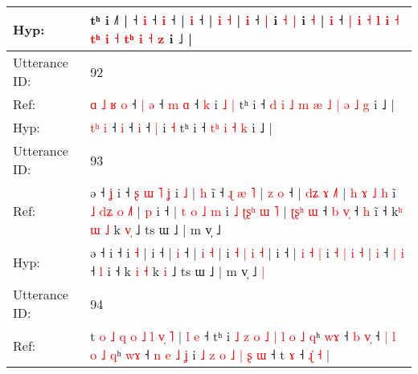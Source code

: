 \documentclass[10pt]{article}
\DeclareRobustCommand{\hl}[1]{{\textcolor{red}{#1}}}
\begin{document}
\begin{longtable}{ll}
 \\
Hyp: & tʰ i ˩˥ |\hl{}\hl{}\hl{}\hl{}\hl{}\hl{} ˧\hl{}\hl{} \hl{i} ˧\hl{}\hl{} \hl{i} ˧ |\hl{}\hl{} \hl{i} ˧\hl{}\hl{}\hl{}\hl{}\hl{}\hl{}\hl{}\hl{} | \hl{}\hl{i} \hl{}\hl{˧} |\hl{}\hl{}\hl{} \hl{i} ˧ \hl{|} i \hl{˧} \hl{|} i \hl{˧} |\hl{}\hl{} \hl{i} ˧\hl{}\hl{}\hl{}\hl{} \hl{|} \hl{}\hl{i} \hl{˧} \hl{l} \hl{i} \hl{}\hl{˧} \hl{}\hl{t}\hl{ʰ} \hl{i} \hl{˧} \hl{}\hl{t}\hl{ʰ} \hl{i} \hl{˧} \hl{z} i ˩\hl{} |
 \\
\midrule
Utterance ID: & 92 \\
Ref: & \hl{ɑ}\hl{ }\hl{˩}\hl{ }\hl{ʁ} \hl{o} ˧\hl{ }\hl{|} \hl{ə} ˧\hl{ }\hl{m} \hl{ɑ} ˧ \hl{k} i\hl{ }\hl{˩} \hl{|} tʰ i ˧\hl{ }\hl{d}\hl{ }\hl{i}\hl{ }\hl{˩}\hl{ }\hl{m}\hl{ }\hl{æ} \hl{˩}\hl{ }\hl{|} \hl{ə} \hl{˩} \hl{g} i ˩ |
 \\
Hyp: & \hl{}\hl{}\hl{}\hl{t}\hl{ʰ} \hl{i} ˧\hl{}\hl{} \hl{i} ˧\hl{}\hl{} \hl{i} ˧ \hl{|} i\hl{}\hl{} \hl{˧} tʰ i ˧\hl{}\hl{}\hl{}\hl{}\hl{}\hl{}\hl{}\hl{}\hl{}\hl{} \hl{}\hl{t}\hl{ʰ} \hl{i} \hl{˧} \hl{k} i ˩ |
 \\
\midrule
Utterance ID: & 93 \\
Ref: & ə ˧\hl{ }\hl{ʝ} i ˧\hl{ }\hl{ʂ}\hl{ }\hl{ɯ}\hl{ }\hl{˥}\hl{ }\hl{ʝ} i \hl{˩} |\hl{ }\hl{h} i\hl{̃} ˧\hl{ }\hl{ɻ}\hl{ }\hl{æ}\hl{ }\hl{˥} |\hl{ }\hl{z} \hl{o} ˧ |\hl{ }\hl{d}\hl{ʑ} \hl{ɤ} \hl{˩}\hl{˥} |\hl{ }\hl{h}\hl{ }\hl{ɤ}\hl{ }\hl{˩}\hl{ }\hl{h} i\hl{̃} \hl{˩} \hl{d}\hl{ʑ} \hl{o} \hl{˩}\hl{˥} |\hl{ }\hl{p} i ˧ |\hl{ }\hl{t} \hl{o} \hl{˩} \hl{m} i \hl{˩} \hl{ʈ}\hl{ʂ}\hl{ʰ} \hl{ɯ} \hl{˥} |\hl{ }\hl{ʈ}\hl{ʂ}\hl{ʰ} \hl{ɯ} ˧ \hl{b} \hl{v}\hl{̩} ˧ \hl{h} i\hl{̃} ˧ k\hl{ʰ} \hl{ɯ} \hl{˩} k \hl{v}\hl{̩} ˩ ts ɯ ˩ | m v̩ ˩\hl{}\hl{}
 \\
Hyp: & ə ˧\hl{}\hl{} i ˧\hl{}\hl{}\hl{}\hl{}\hl{}\hl{}\hl{}\hl{} i \hl{˧} |\hl{}\hl{} i\hl{} ˧\hl{}\hl{}\hl{}\hl{}\hl{}\hl{} |\hl{}\hl{} \hl{i} ˧ |\hl{}\hl{}\hl{} \hl{i} \hl{}\hl{˧} |\hl{}\hl{}\hl{}\hl{}\hl{}\hl{}\hl{}\hl{} i\hl{} \hl{˧} \hl{}\hl{|} \hl{i} \hl{}\hl{˧} |\hl{}\hl{} i ˧ |\hl{}\hl{} \hl{i} \hl{˧} \hl{|} i \hl{˧} \hl{}\hl{}\hl{|} \hl{i} \hl{˧} |\hl{}\hl{}\hl{}\hl{} \hl{i} ˧ \hl{|} \hl{}\hl{i} ˧ \hl{l} i\hl{} ˧ k\hl{} \hl{i} \hl{˧} k \hl{}\hl{i} ˩ ts ɯ ˩ | m v̩ ˩\hl{ }\hl{|}
 \\
\midrule
Utterance ID: & 94 \\
Ref: & t\hl{ }\hl{o} \hl{˩} \hl{q} \hl{o} \hl{˩} \hl{l} \hl{v}\hl{̩} \hl{˥} |\hl{ }\hl{l} \hl{e} ˧ tʰ i\hl{ }\hl{˩}\hl{ }\hl{z}\hl{ }\hl{o}\hl{ }\hl{˩}\hl{ }\hl{|}\hl{ }\hl{l}\hl{ }\hl{o} \hl{˩} \hl{q}ʰ \hl{w}\hl{ɤ} ˧ \hl{b}\hl{ }\hl{v}\hl{̩} ˧ \hl{|}\hl{ }\hl{l} \hl{o} \hl{˩} \hl{q}ʰ \hl{w}\hl{ɤ} ˧\hl{ }\hl{n}\hl{ }\hl{e}\hl{ }\hl{˩} \hl{ʝ} i \hl{˩} \hl{z} \hl{o} \hl{˩} \hl{|}\hl{ }\hl{ʂ} \hl{ɯ} ˧ t\hl{} \hl{ɤ} ˧ \hl{}\hl{ɻ}\hl{̍} \hl{˧} |

\end{longtable}
\end{document}

